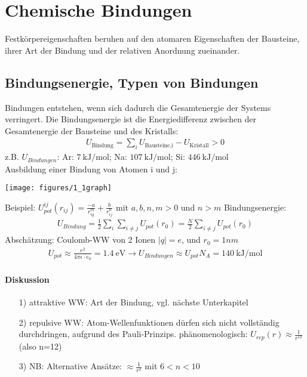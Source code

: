 \newpage
\section{Chemische Bindungen} \label{kap:1}
	Festkörpereigenschaften beruhen auf den atomaren Eigenschaften der Bausteine, ihrer Art der Bindung und der relativen Anordnung zueinander.

\subsection{Bindungsenergie, Typen von Bindungen}\label{kap:1_1}
	Bindungen entstehen, wenn sich dadurch die Gesamtenergie der Systems verringert. Die Bindungsenergie ist die Energiedifferenz zwischen der Gesamtenergie der Bausteine und des Kristalls:
	\begin{align}
		U_{\text{Bindung}} = \sum_i U_{\text{Bausteine,i}}-U_{\text{Kristall}} > 0
	\end{align}
	z.B. $U_{Bindungen}$:  Ar: $ \SI{7}{\kilo\joule\per\mole} $; Na: $ \SI{107}{\kilo\joule\per\mole} $; Si: $ \SI{446}{\kilo\joule\per\mole}$ \\
	Ausbildung einer Bindung von Atomen i und j:
	\begin{center}
		\texttt{[image: figures/1\_1graph]}
	\end{center}
	Beispiel: $U_{pot}^{ij}(r_{ij})= \frac{-a}{r_{ig}^m}+\frac{b}{r_{ij}^n}$ mit $a,b,n,m > 0$ und $n>m$ \newline
	Bindungsenergie:
	\begin{align}
		U_{Bindung} = \frac{1}{2}\sum_i\sum_{i\neq j}U_{pot}(r_0) = \frac{N}{2} \sum_{i\neq j} U_{pot}(r_0)
	\end{align}
	Abschätzung: Coulomb-WW von 2 Ionen $|q| = e$, und $r_0 = 1nm$
	\begin{align}
		U_{pot} \approx \frac{e^2}{4\pi\epsilon\cdot e_0}=\SI{1.4}{\electronvolt} \rightarrow U_{Bindungen} \approx U_{pot} N_A = \SI{140}{\kilo\joule\per\mole}
	\end{align}

\paragraph{Diskussion}
	\begin{itemize}
		\item[1)] attraktive WW: Art der Bindung, vgl. nächste Unterkapitel
		\item[2)] repulsive WW: Atom-Wellenfunktionen dürfen sich nicht vollständig durchdringen, aufgrund des Pauli-Prinzips. phänomenologisch: $U_{rep}(r)\approx \frac{1}{r^{12}}$(also n=12)
		\item[3)] NB: Alternative Ansätze: $\approx \frac{1}{r^2}$ mit $6<n<10$
	\end{itemize}

